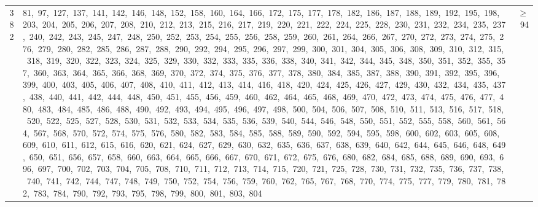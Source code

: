\begin{longtable}{c|p{}|r}
382 & 81,\ 97,\ 127,\ 137,\ 141,\ 142,\ 146,\ 148,\ 152,\ 158,\ 160,\ 164,\ 166,\ 172,\ 175,\ 177,\ 178,\ 182,\ 186,\ 187,\ 188,\ 189,\ 192,\ 195,\ 198,\ 203,\ 204,\ 205,\ 206,\ 207,\ 208,\ 210,\ 212,\ 213,\ 215,\ 216,\ 217,\ 219,\ 220,\ 221,\ 222,\ 224,\ 225,\ 228,\ 230,\ 231,\ 232,\ 234,\ 235,\ 237,\ 240,\ 242,\ 243,\ 245,\ 247,\ 248,\ 250,\ 252,\ 253,\ 254,\ 255,\ 256,\ 258,\ 259,\ 260,\ 261,\ 264,\ 266,\ 267,\ 270,\ 272,\ 273,\ 274,\ 275,\ 276,\ 279,\ 280,\ 282,\ 285,\ 286,\ 287,\ 288,\ 290,\ 292,\ 294,\ 295,\ 296,\ 297,\ 299,\ 300,\ 301,\ 304,\ 305,\ 306,\ 308,\ 309,\ 310,\ 312,\ 315,\ 318,\ 319,\ 320,\ 322,\ 323,\ 324,\ 325,\ 329,\ 330,\ 332,\ 333,\ 335,\ 336,\ 338,\ 340,\ 341,\ 342,\ 344,\ 345,\ 348,\ 350,\ 351,\ 352,\ 355,\ 357,\ 360,\ 363,\ 364,\ 365,\ 366,\ 368,\ 369,\ 370,\ 372,\ 374,\ 375,\ 376,\ 377,\ 378,\ 380,\ 384,\ 385,\ 387,\ 388,\ 390,\ 391,\ 392,\ 395,\ 396,\ 399,\ 400,\ 403,\ 405,\ 406,\ 407,\ 408,\ 410,\ 411,\ 412,\ 413,\ 414,\ 416,\ 418,\ 420,\ 424,\ 425,\ 426,\ 427,\ 429,\ 430,\ 432,\ 434,\ 435,\ 437,\ 438,\ 440,\ 441,\ 442,\ 444,\ 448,\ 450,\ 451,\ 455,\ 456,\ 459,\ 460,\ 462,\ 464,\ 465,\ 468,\ 469,\ 470,\ 472,\ 473,\ 474,\ 475,\ 476,\ 477,\ 480,\ 483,\ 484,\ 485,\ 486,\ 488,\ 490,\ 492,\ 493,\ 494,\ 495,\ 496,\ 497,\ 498,\ 500,\ 504,\ 506,\ 507,\ 508,\ 510,\ 511,\ 513,\ 516,\ 517,\ 518,\ 520,\ 522,\ 525,\ 527,\ 528,\ 530,\ 531,\ 532,\ 533,\ 534,\ 535,\ 536,\ 539,\ 540,\ 544,\ 546,\ 548,\ 550,\ 551,\ 552,\ 555,\ 558,\ 560,\ 561,\ 564,\ 567,\ 568,\ 570,\ 572,\ 574,\ 575,\ 576,\ 580,\ 582,\ 583,\ 584,\ 585,\ 588,\ 589,\ 590,\ 592,\ 594,\ 595,\ 598,\ 600,\ 602,\ 603,\ 605,\ 608,\ 609,\ 610,\ 611,\ 612,\ 615,\ 616,\ 620,\ 621,\ 624,\ 627,\ 629,\ 630,\ 632,\ 635,\ 636,\ 637,\ 638,\ 639,\ 640,\ 642,\ 644,\ 645,\ 646,\ 648,\ 649,\ 650,\ 651,\ 656,\ 657,\ 658,\ 660,\ 663,\ 664,\ 665,\ 666,\ 667,\ 670,\ 671,\ 672,\ 675,\ 676,\ 680,\ 682,\ 684,\ 685,\ 688,\ 689,\ 690,\ 693,\ 696,\ 697,\ 700,\ 702,\ 703,\ 704,\ 705,\ 708,\ 710,\ 711,\ 712,\ 713,\ 714,\ 715,\ 720,\ 721,\ 725,\ 728,\ 730,\ 731,\ 732,\ 735,\ 736,\ 737,\ 738,\ 740,\ 741,\ 742,\ 744,\ 747,\ 748,\ 749,\ 750,\ 752,\ 754,\ 756,\ 759,\ 760,\ 762,\ 765,\ 767,\ 768,\ 770,\ 774,\ 775,\ 777,\ 779,\ 780,\ 781,\ 782,\ 783,\ 784,\ 790,\ 792,\ 793,\ 795,\ 798,\ 799,\ 800,\ 801,\ 803,\ 804 & $\ge$ 94 \\

\end{longtable}
